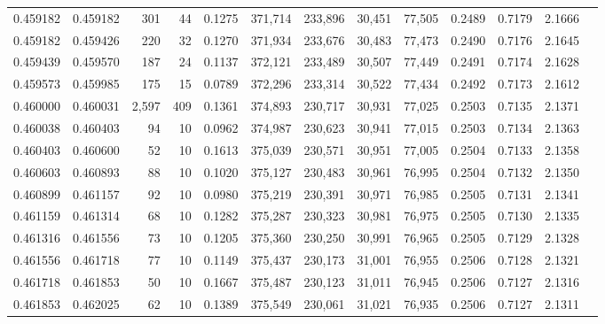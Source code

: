 \begin{tabular}{rrrrrrrrrrrrr}
0.459182 & 0.459182 &   301 &  44 &                                     0.1275 & 371,714 & 233,896 &  30,451 &  77,505 & 0.2489 & 0.7179 & 2.1666 \\
0.459182 & 0.459426 &   220 &  32 &                                     0.1270 & 371,934 & 233,676 &  30,483 &  77,473 & 0.2490 & 0.7176 & 2.1645 \\
0.459439 & 0.459570 &   187 &  24 &                                     0.1137 & 372,121 & 233,489 &  30,507 &  77,449 & 0.2491 & 0.7174 & 2.1628 \\
0.459573 & 0.459985 &   175 &  15 &                                     0.0789 & 372,296 & 233,314 &  30,522 &  77,434 & 0.2492 & 0.7173 & 2.1612 \\
0.460000 & 0.460031 & 2,597 & 409 &                                     0.1361 & 374,893 & 230,717 &  30,931 &  77,025 & 0.2503 & 0.7135 & 2.1371 \\
0.460038 & 0.460403 &    94 &  10 &                                     0.0962 & 374,987 & 230,623 &  30,941 &  77,015 & 0.2503 & 0.7134 & 2.1363 \\
0.460403 & 0.460600 &    52 &  10 &                                     0.1613 & 375,039 & 230,571 &  30,951 &  77,005 & 0.2504 & 0.7133 & 2.1358 \\
0.460603 & 0.460893 &    88 &  10 &                                     0.1020 & 375,127 & 230,483 &  30,961 &  76,995 & 0.2504 & 0.7132 & 2.1350 \\
0.460899 & 0.461157 &    92 &  10 &                                     0.0980 & 375,219 & 230,391 &  30,971 &  76,985 & 0.2505 & 0.7131 & 2.1341 \\
0.461159 & 0.461314 &    68 &  10 &                                     0.1282 & 375,287 & 230,323 &  30,981 &  76,975 & 0.2505 & 0.7130 & 2.1335 \\
0.461316 & 0.461556 &    73 &  10 &                                     0.1205 & 375,360 & 230,250 &  30,991 &  76,965 & 0.2505 & 0.7129 & 2.1328 \\
0.461556 & 0.461718 &    77 &  10 &                                     0.1149 & 375,437 & 230,173 &  31,001 &  76,955 & 0.2506 & 0.7128 & 2.1321 \\
0.461718 & 0.461853 &    50 &  10 &                                     0.1667 & 375,487 & 230,123 &  31,011 &  76,945 & 0.2506 & 0.7127 & 2.1316 \\
0.461853 & 0.462025 &    62 &  10 &                                     0.1389 & 375,549 & 230,061 &  31,021 &  76,935 & 0.2506 & 0.7127 & 2.1311 \\

\end{tabular}
